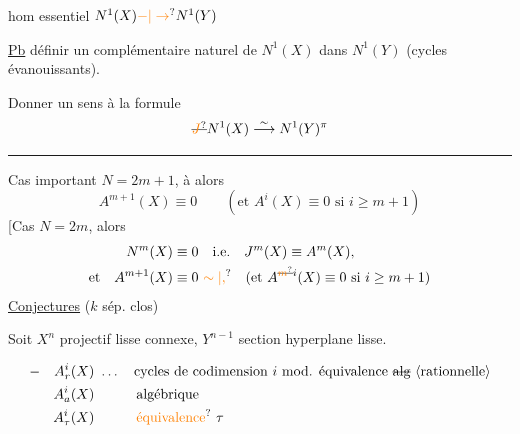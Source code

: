 hom essentiel \qquad $N^1(X)\unsure{\mathord{-}|\to}N^1(Y)$

\uline{Pb} définir un complémentaire naturel de $N^1(X)$ dans $N^1(Y)$ (cycles évanouissants). 

Donner un sens à la formule
\[
 \deleted{\unsure{J}}N^1(X)\overset{\sim}{\longrightarrow}N^1(Y)^{\pi}
\]

\noindent\rule{\linewidth}{0.35pt}

Cas important \qquad $N=2m+1$, à  alors
\[
 A^{m+1}(X)\equiv0\qquad(\text{et }A^i(X)\equiv0\text{ si } i\geq m+1)
\]
[Cas \qquad $N=2m$, alors
\[
\begin{aligned}
 N^m(X)&\equiv0\quad\text{i.e.}\quad J^m(X)\equiv A^m(X),\\
 \text{et}\quad A^{m+1}(X)&\equiv0\ \unsure{\sim|,}\quad
 (\text{et }A^{\deleted{\unsure{m}}i}(X)\equiv0\text{ si }i\geq m+1)
\end{aligned}
\]
\uline{Conjectures}  \quad ($k$ sép. clos)

Soit $X^n$ projectif lisse connexe, $Y^{n-1}$ section hyperplane lisse.

\[
\begin{aligned}
 -\quad A^i_r(X)&\ \ldots\quad\text{cycles de codimension $i$ mod. équivalence \deleted{alg} \inserted{rationnelle}}\\
 A^i_a(X)&\hspace{3em}\text{algébrique}\\
 A^i_{\tau}(X)&\hspace{3em}\text{\unsure{équivalence} $\tau$}
\end{aligned}
\]

